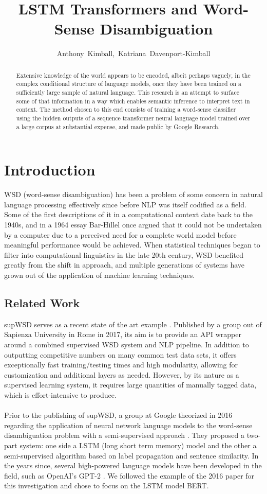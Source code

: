 \documentclass{IEEEtran}
\title{LSTM Transformers and Word-Sense Disambiguation}
\author{Anthony~Kimball,~Katriana~Davenport-Kimball}
\begin{document}
\maketitle

\begin{abstract}
Extensive knowledge of the world appears to be encoded, albeit perhaps vaguely, in the complex conditional structure of language models, once they have been trained on a sufficiently large sample of natural language.  	This research is an attempt to surface some of that information in a way which enables semantic inference to interpret text in context.  The method chosen to this end consists of training a word-sense classifier using the hidden outputs of a sequence transformer neural language model trained over a large corpus at substantial expense, and made public by Google Research.
\end{abstract}
\section{Introduction}
	WSD (word-sense disambiguation) has been a problem of some concern in natural language processing effectively since before NLP was itself codified as a field. Some of the first descriptions of it in a computational context date back to the 1940s, and in a 1964 essay Bar-Hillel once argued that it could not be undertaken by a computer due to a perceived need for a complete world model before meaningful performance would be achieved. When statistical techniques began to filter into computational linguistics in the late 20th century, WSD benefited greatly from the shift in approach, and multiple generations of systems have grown out of the application of machine learning techniques.
	
\subsection{Related Work}
	supWSD serves as a recent state of the art example \cite{supwsd}. Published by a group out of Sapienza University in Rome in 2017, its aim is to provide an API wrapper around a combined supervised WSD system and NLP pipeline. In addition to outputting competitive numbers on many common test data sets, it offers exceptionally fast training/testing times and high modularity, allowing for customization and additional layers as needed. However, by its nature as a supervised learning system, it requires large quantities of manually tagged data, which is effort-intensive to produce.
	\\ \\
	Prior to the publishing of supWSD, a group at Google theorized in 2016 regarding the application of neural network language models to the word-sense disambiguation problem with a semi-supervised approach \cite{wsd-nlm}. They proposed a two-part system: one side a LSTM (long short term memory) model and the other a semi-supervised algorithm based on label propagation and sentence similarity. In the years since, several high-powered language models have been developed in the field, such as OpenAI's GPT-2 \cite{gpt2}. We followed the example of the 2016 paper for this investigation and chose to focus on the LSTM model BERT.
\end{document}
